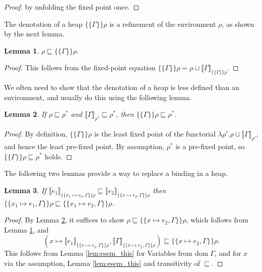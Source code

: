 \documentclass{jfp1}
\newtheorem{lemma}{Lemma}
\theoremstyle{nonumberbreak}
\newtheorem{proof}{Proof}
\newcommand{\dom}[1]{\text{dom}\;#1}
\newcommand{\dsem}[2]{\llbracket #1 \rrbracket_{#2}}
\newcommand{\esem}[1]{\{\!\!\!\{#1\}\!\!\!\}}
\begin{document}
\begin{proof}
by unfolding the fixed point once.
\end{proof}

The denotation of a heap $\esem\Gamma\rho$ is a refinement of the environment $\rho$, as shown by the next lemma.

\begin{lemma}
$\rho \sqsubseteq \esem{\Gamma}{\rho}$.
\label{lem:rho_below_esem}
\end{lemma}

\begin{proof}
This follows from the fixed-point equation $\esem{\Gamma}{\rho} = \rho \sqcup \dsem{\Gamma}{\esem{\Gamma}{\rho}}$.
\end{proof}

We often need to show that the denotation of a heap is less defined than an environment, and usually do this using the following lemma.
\begin{lemma}
If $\rho \sqsubseteq \rho^*$ and $\dsem{\Gamma}{\rho^*} \sqsubseteq \rho^*$, then $\esem{\Gamma}\rho \sqsubseteq \rho^*$.
\label{lem:esem_below}
\end{lemma}

\begin{proof}
By definition, $\esem{\Gamma}\rho$ is the least fixed point of the functorial $\lambda \rho'. \rho \sqcup \dsem{\Gamma}{\rho'}$, and hence the least pre-fixed point. By assumption, $\rho^*$ is a pre-fixed point, so $\esem{\Gamma}\rho \sqsubseteq \rho^*$ holds.
\end{proof}

The following two lemmas provide a way to replace a binding in a heap.
\begin{lemma}
If $\dsem{e_1}{\esem{x_1 \mapsto e_2, \Gamma}\rho} \sqsubseteq \dsem{e_2}{\esem{x \mapsto e_2, \Gamma}\rho}$
then $\esem{x_1 \mapsto e_1, \Gamma}\rho \sqsubseteq \esem{x_1 \mapsto e_2, \Gamma}\rho$.
\label{lem:esem_subst_expr_below}
\end{lemma}

\begin{proof}
By Lemma \ref{lem:esem_below}, it suffices to show $\rho \sqsubseteq \esem{x \mapsto e_2, \Gamma}\rho$, which follows from  Lemma \ref{lem:rho_below_esem}, and 
\[
(x \mapsto \dsem{e_1}{\esem{x \mapsto e_2, \Gamma}\rho}, \dsem{\Gamma}{\esem{x \mapsto e_2, \Gamma}\rho}) \sqsubseteq \esem{x \mapsto e_2, \Gamma}\rho.
\]
This follows from Lemma \ref{lem:esem_this} for Variables from $\dom\Gamma$, and for $x$ via the assumption, Lemma \ref{lem:esem_this} and transitivity of $\sqsubseteq$.
\end{proof}
\end{document}
